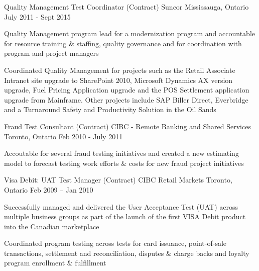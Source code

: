 \begin{cventries}
  \cventry
    {Quality Management Test Coordinator (Contract)} %
    {Suncor} %
    {Mississauga, Ontario} %
    {July 2011 - Sept 2015} %
    {
      \begin{cvitems} %
        \item {Quality Management program lead for a modernization program and accountable for resource training \& staffing, quality governance and for coordination with program and project managers}
        \item {Coordinated Quality Management for projects such as the Retail Associate Intranet site upgrade to SharePoint 2010, Microsoft Dynamics AX version upgrade, Fuel Pricing Application upgrade and the POS Settlement application upgrade from Mainframe. Other projects include SAP Biller Direct, Everbridge and a Turnaround Safety and Productivity Solution in the Oil Sands}
      \end{cvitems}
    }

  \cventry
    {Fraud Test Consultant (Contract)} %
    {CIBC - Remote Banking and Shared Services} %
    {Toronto, Ontario} %
    {Feb 2010 - July 2011} %
    {
      \begin{cvitems} %
        \item {Accoutable for several fraud testing initiatives and created a new estimating model to forecast testing work efforts \& costs for new fraud project initiatives}
      \end{cvitems}
    }

  \cventry
    {Visa Debit: UAT Test Manager (Contract)} %
    {CIBC Retail Markets} %
    {Toronto, Ontario} %
    {Feb 2009 – Jan 2010} %
    {
      \begin{cvitems} %
        \item {Successfully managed and delivered the User Acceptance Test (UAT) across multiple business groups as part of the launch of the first VISA Debit product into the Canadian marketplace}
        \item {Coordinated program testing across tests for card issuance, point-of-sale transactions, settlement and reconciliation, disputes \& charge backs and loyalty program enrollment \& fulfillment}
      \end{cvitems}
    }


\end{cventries}
